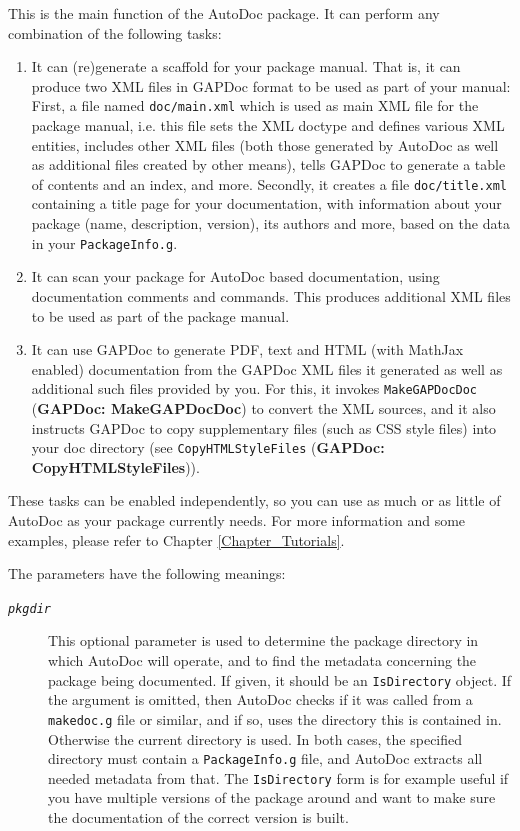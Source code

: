 \documentclass[a4paper,11pt]{report}
\begin{document}
{{{ This is the main function of the \textsf{AutoDoc} package. It can perform any combination of the following tasks: 
\begin{enumerate}
\item  It can (re)generate a scaffold for your package manual. That is, it can
produce two XML files in \textsf{GAPDoc} format to be used as part of your manual: First, a file named \texttt{doc/{\textunderscore}main.xml} which is used as main XML file for the package manual, i.e. this file sets the
XML doctype and defines various XML entities, includes other XML files (both
those generated by \textsf{AutoDoc} as well as additional files created by other means), tells \textsf{GAPDoc} to generate a table of contents and an index, and more. Secondly, it creates a
file \texttt{doc/title.xml} containing a title page for your documentation, with information about your
package (name, description, version), its authors and more, based on the data
in your \texttt{PackageInfo.g}. 
\item  It can scan your package for \textsf{AutoDoc} based documentation, using documentation comments and commands. This produces
additional XML files to be used as part of the package manual. 
\item  It can use \textsf{GAPDoc} to generate PDF, text and HTML (with MathJax enabled) documentation from the \textsf{GAPDoc} XML files it generated as well as additional such files provided by you. For
this, it invokes \texttt{MakeGAPDocDoc} (\textbf{GAPDoc: MakeGAPDocDoc}) to convert the XML sources, and it also instructs \textsf{GAPDoc} to copy supplementary files (such as CSS style files) into your doc directory
(see \texttt{CopyHTMLStyleFiles} (\textbf{GAPDoc: CopyHTMLStyleFiles})). 
\end{enumerate}
 These tasks can be enabled independently, so you can use as much or as little
of \textsf{AutoDoc} as your package currently needs. For more information and some examples,
please refer to Chapter \ref{Chapter_Tutorials}. 

 The parameters have the following meanings: 
\begin{description}
\item[{\mbox{\texttt{\mdseries\slshape pkgdir}}}]  This optional parameter is used to determine the package directory in which \textsf{AutoDoc} will operate, and to find the metadata concerning the package being
documented. If given, it should be an \texttt{IsDirectory} object. If the argument is omitted, then \textsf{AutoDoc} checks if it was called from a \texttt{makedoc.g} file or similar, and if so, uses the directory this is contained in. Otherwise
the current directory is used. In both cases, the specified directory must
contain a \texttt{PackageInfo.g} file, and \textsf{AutoDoc} extracts all needed metadata from that. The \texttt{IsDirectory} form is for example useful if you have multiple versions of the package around
and want to make sure the documentation of the correct version is built. 


\end{description}}}}
\end{document}
